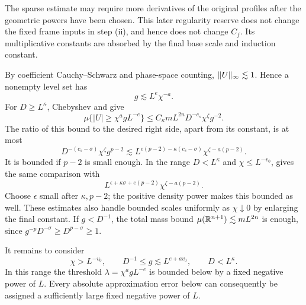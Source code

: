 The sparse estimate may require more derivatives of the original
profiles after the geometric powers have been chosen.  This later
regularity reserve does not change the fixed frame inputs in step
\textup{(ii)}, and hence does not change $C_f$.  Its multiplicative
constants are absorbed by the final base scale and induction constant.

By coefficient Cauchy--Schwarz and phase-space counting,
$\lVert U\rVert_\infty\lesssim1$.  Hence a nonempty level set has
\begin{equation}\label{w:eq-gtrivial}
 g\lesssim L^e\chi^{-a}.
\end{equation}
For $D\geq L^\kappa$, Chebyshev and  give
\begin{equation}\label{w:eq-largeD}
 \mu\{|U|\geq\chi^agL^{-e}\}
 \leq C_\kappa mL^{2n}D^{-c_s}\chi^{\zeta}g^{-2}.
\end{equation}
The ratio of this bound to the desired right side, apart from its
constant, is at most
\[
 D^{-(c_s-\sigma)}\chi^{\zeta}g^{p-2}
 \lesssim L^{e(p-2)-\kappa(c_s-\sigma)}
       \chi^{\zeta-a(p-2)}.
\]
It is bounded if $p-2$ is small enough.  In the range
$D<L^\kappa$ and $\chi\leq L^{-v_0}$,  gives
the same comparison with
\[
 L^{\epsilon+\kappa\sigma+e(p-2)}
 \chi^{\zeta-a(p-2)}.
\]
Choose $\epsilon$ small after $\kappa,p-2$; the positive density
power makes this bounded as well.  These estimates also handle bounded
scales uniformly as $\chi\downarrow0$ by enlarging the final constant.
If $g<D^{-1}$, the total mass bound $\mu(\mathbb R^{n+1})\lesssim mL^{2n}$
is enough, since $g^{-p}D^{-\sigma}\geq D^{p-\sigma}\geq1$.

It remains to consider
\begin{equation}\label{w:eq-active}
 \chi>L^{-v_0},\qquad D^{-1}\leq g\lesssim L^{e+av_0},
 \qquad D<L^\kappa.
\end{equation}
In this range the threshold $\lambda=\chi^agL^{-e}$ is bounded
below by a fixed negative power of $L$.  Every absolute approximation
error below can consequently be assigned a sufficiently large fixed
negative power of $L$.




